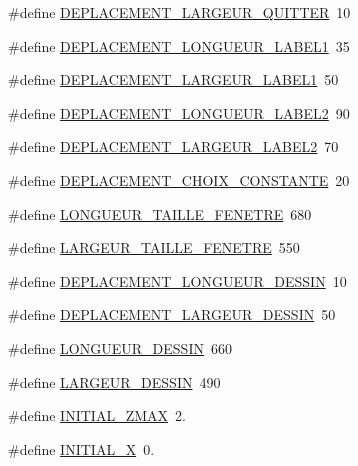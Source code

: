 \begin{DoxyCompactItemize}
\item 
\#define \hyperlink{types_8hh_abaa1b7ac71c7ab6b0fb5ae6a690ff33f}{D\+E\+P\+L\+A\+C\+E\+M\+E\+N\+T\+\_\+\+L\+A\+R\+G\+E\+U\+R\+\_\+\+Q\+U\+I\+T\+T\+ER}~10
\item 
\#define \hyperlink{types_8hh_a08daeda25c68c4b44d1675b02f320ca4}{D\+E\+P\+L\+A\+C\+E\+M\+E\+N\+T\+\_\+\+L\+O\+N\+G\+U\+E\+U\+R\+\_\+\+L\+A\+B\+E\+L1}~35
\item 
\#define \hyperlink{types_8hh_a93af5f8e9e7a9490e23a433ddeb207eb}{D\+E\+P\+L\+A\+C\+E\+M\+E\+N\+T\+\_\+\+L\+A\+R\+G\+E\+U\+R\+\_\+\+L\+A\+B\+E\+L1}~50
\item 
\#define \hyperlink{types_8hh_a9f4abf26fe84bb0c17523bfb3de52740}{D\+E\+P\+L\+A\+C\+E\+M\+E\+N\+T\+\_\+\+L\+O\+N\+G\+U\+E\+U\+R\+\_\+\+L\+A\+B\+E\+L2}~90
\item 
\#define \hyperlink{types_8hh_ade616ee12a18b514a377c0131fa0569c}{D\+E\+P\+L\+A\+C\+E\+M\+E\+N\+T\+\_\+\+L\+A\+R\+G\+E\+U\+R\+\_\+\+L\+A\+B\+E\+L2}~70
\item 
\#define \hyperlink{types_8hh_a98f56bb37febe3f04302a2dc6f18dcb5}{D\+E\+P\+L\+A\+C\+E\+M\+E\+N\+T\+\_\+\+C\+H\+O\+I\+X\+\_\+\+C\+O\+N\+S\+T\+A\+N\+TE}~20
\item 
\#define \hyperlink{types_8hh_a7471d369850cf249e1cdb1a2c5893f00}{L\+O\+N\+G\+U\+E\+U\+R\+\_\+\+T\+A\+I\+L\+L\+E\+\_\+\+F\+E\+N\+E\+T\+RE}~680
\item 
\#define \hyperlink{types_8hh_a3e8a53eba010d4580b4dde5a2d5b5f45}{L\+A\+R\+G\+E\+U\+R\+\_\+\+T\+A\+I\+L\+L\+E\+\_\+\+F\+E\+N\+E\+T\+RE}~550
\item 
\#define \hyperlink{types_8hh_a2e32881b9e21271d99f4363769c4d012}{D\+E\+P\+L\+A\+C\+E\+M\+E\+N\+T\+\_\+\+L\+O\+N\+G\+U\+E\+U\+R\+\_\+\+D\+E\+S\+S\+IN}~10
\item 
\#define \hyperlink{types_8hh_aa78ea118e502926d1dc1179e41e5a723}{D\+E\+P\+L\+A\+C\+E\+M\+E\+N\+T\+\_\+\+L\+A\+R\+G\+E\+U\+R\+\_\+\+D\+E\+S\+S\+IN}~50
\item 
\#define \hyperlink{types_8hh_a8e777775b0e09bd2e13deb7ec27dc9cd}{L\+O\+N\+G\+U\+E\+U\+R\+\_\+\+D\+E\+S\+S\+IN}~660
\item 
\#define \hyperlink{types_8hh_a67355ecd417193df8f2067681c44e9e6}{L\+A\+R\+G\+E\+U\+R\+\_\+\+D\+E\+S\+S\+IN}~490
\item 
\#define \hyperlink{types_8hh_a6750d89903ca4cacf85ad488f115fdb6}{I\+N\+I\+T\+I\+A\+L\+\_\+\+Z\+M\+AX}~2.
\item 
\#define \hyperlink{types_8hh_a6752dd4b26e986973fbbc8e18423a476}{I\+N\+I\+T\+I\+A\+L\+\_\+X}~0.
\item 

\end{DoxyCompactItemize}
